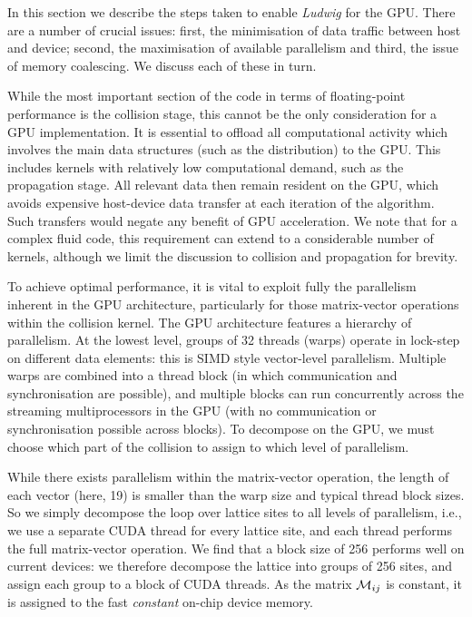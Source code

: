In this section we describe the steps taken to enable \textit{Ludwig}
for the GPU. There are a number of crucial issues: first, the
minimisation of data traffic between host and device; second, the
maximisation of available parallelism and third, the issue of
memory coalescing. We discuss each of these in turn.

While the most important section of the code in terms of floating-point
performance is the collision stage, this cannot be the only consideration
for a GPU implementation. It is essential to offload all computational
activity which involves the main data structures (such as the distribution)
to the GPU. This includes kernels with relatively low computational demand,
such as the propagation stage. All relevant data then remain resident on
the GPU, which avoids expensive host-device data transfer at each iteration
of the algorithm. Such transfers would negate any benefit of GPU acceleration.
We note that for a complex fluid code, this requirement can extend to a
considerable number of kernels, although we limit the discussion to
collision and propagation for brevity.

To achieve optimal performance, it is vital to exploit fully the
parallelism inherent in the GPU architecture, particularly for
those matrix-vector operations within the collision kernel.
The GPU architecture features a hierarchy of parallelism. At the
lowest level, groups of 32 threads (warps) operate in
lock-step on different data elements: this is SIMD style vector-level
parallelism. Multiple warps are combined into a thread block (in which
communication and synchronisation are possible), and multiple blocks can
run concurrently across the streaming multiprocessors in the GPU
(with no communication or
synchronisation possible across blocks).  To decompose on the GPU, we
must choose which part of the collision to assign to which level of
parallelism.

While there exists parallelism within the matrix-vector operation, the
length of each vector (here, 19) is smaller than the warp size and typical
thread block sizes. So we simply decompose the loop over lattice sites
to all levels of parallelism, i.e., we use a separate CUDA thread for
every lattice site, and each thread performs the full matrix-vector
operation. We find that a block size of 256 performs well on current
devices: we therefore decompose
the lattice into groups of 256 sites, and assign each group to a block
of CUDA threads. As the matrix ${\cal M}_{ij}$ is constant, it is
assigned to the fast {\it constant} on-chip device memory.


